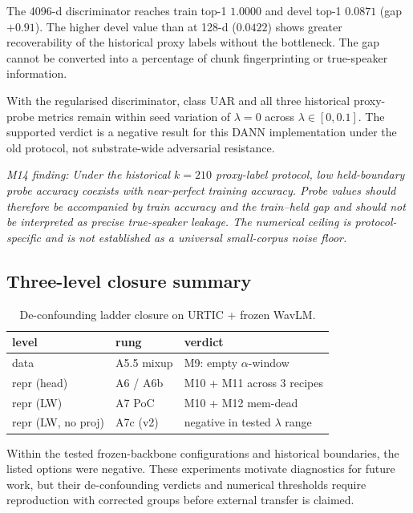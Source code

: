 The 4096-d discriminator reaches train top-1 $1.0000$ and devel top-1 $0.0871$ (gap $+0.91$). The higher devel value than at 128-d ($0.0422$) shows greater recoverability of the historical proxy labels without the bottleneck. The gap cannot be converted into a percentage of chunk fingerprinting or true-speaker information.

With the regularised discriminator, class UAR and all three historical proxy-probe metrics remain within seed variation of $\lambda=0$ across $\lambda\in[0,0.1]$. The supported verdict is a negative result for this DANN implementation under the old protocol, not substrate-wide adversarial resistance.

\textit{M14 finding:} \emph{Under the historical $k=210$ proxy-label protocol, low held-boundary probe accuracy coexists with near-perfect training accuracy. Probe values should therefore be accompanied by train accuracy and the train--held gap and should not be interpreted as precise true-speaker leakage. The numerical ceiling is protocol-specific and is not established as a universal small-corpus noise floor.}

\subsection{Three-level closure summary}

\begin{table}[t]
\centering\small
\caption{De-confounding ladder closure on URTIC + frozen WavLM.}
\label{tab:closure}
\begin{tabular}{llp{3.0cm}}
\toprule
level & rung & verdict \\
\midrule
data         & A5.5 mixup        & M9: empty $\alpha$-window \\
repr (head)  & A6 / A6b          & M10 + M11 across 3 recipes \\
repr (LW)    & A7 PoC            & M10 + M12 mem-dead \\
repr (LW, no proj) & A7c (v2)    & negative in tested $\lambda$ range \\
\bottomrule
\end{tabular}
\end{table}

Within the tested frozen-backbone configurations and historical boundaries, the listed options were negative. These experiments motivate diagnostics for future work, but their de-confounding verdicts and numerical thresholds require reproduction with corrected groups before external transfer is claimed.

